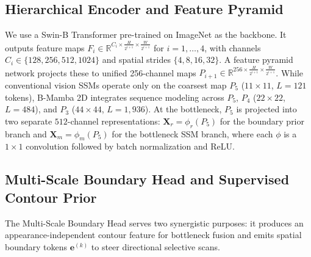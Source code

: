 \documentclass[journal]{IEEEtran}
\newcommand{\R}{\mathbb{R}}
\newcommand{\vect}[1]{\bm{#1}}
\begin{document}
\subsection{Hierarchical Encoder and Feature Pyramid}
We use a Swin-B Transformer \cite{liu2021swin} pre-trained on ImageNet as the backbone. It outputs feature maps $F_i\in\R^{C_i\times\frac{H}{2^{i+1}}\times\frac{W}{2^{i+1}}}$ for $i=1,\dots,4$, with channels $C_i\in\{128,256,512,1024\}$ and spatial strides $\{4,8,16,32\}$. A feature pyramid network \cite{lin2017fpn} projects these to unified 256-channel maps $P_{i+1}\in\R^{256\times\frac{H}{2^{i+1}}\times\frac{W}{2^{i+1}}}$. While conventional vision SSMs operate only on the coarsest map $P_5$ ($11\times11$, $L=121$ tokens), B-Mamba 2D integrates sequence modeling across $P_5$, $P_4$ ($22\times22$, $L=484$), and $P_3$ ($44\times44$, $L=1{,}936$). At the bottleneck, $P_5$ is projected into two separate $512$-channel representations: $\vect{X}_r=\phi_r(P_5)$ for the boundary prior branch and $\vect{X}_m=\phi_m(P_5)$ for the bottleneck SSM branch, where each $\phi$ is a $1\times1$ convolution followed by batch normalization and ReLU.

\subsection{Multi-Scale Boundary Head and Supervised Contour Prior}
\label{sec:bpe}
The Multi-Scale Boundary Head serves two synergistic purposes: it produces an appearance-independent contour feature for bottleneck fusion and emits spatial boundary tokens $\vect{e}^{(k)}$ to steer directional selective scans.
\end{document}
